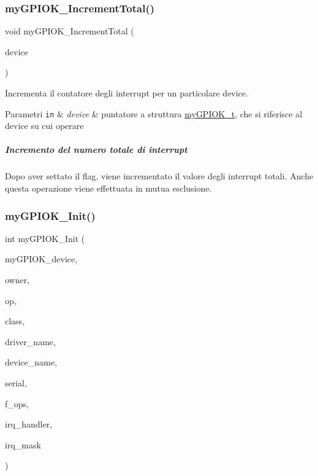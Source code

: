 \subsubsection{\texorpdfstring{my\+G\+P\+I\+O\+K\+\_\+\+Increment\+Total()}{myGPIOK\_IncrementTotal()}}
{\footnotesize\ttfamily void my\+G\+P\+I\+O\+K\+\_\+\+Increment\+Total (\begin{DoxyParamCaption}\item[{\hyperlink{structmy_g_p_i_o_k__t}{my\+G\+P\+I\+O\+K\+\_\+t} $\ast$}]{device }\end{DoxyParamCaption})}



Incrementa il contatore degli interrupt per un particolare device. 


\begin{DoxyParams}[1]{Parametri}
\mbox{\tt in}  & {\em device} & puntatore a struttura \hyperlink{structmy_g_p_i_o_k__t}{my\+G\+P\+I\+O\+K\+\_\+t}, che si riferisce al device su cui operare\\
\hline
\end{DoxyParams}
\subparagraph*{Incremento del numero totale di interrupt}

Dopo aver settato il flag, viene incrementato il valore degli interrupt totali. Anche questa operazione viene effettuata in mutua esclusione. \mbox{\label{group___linux-_driver_ga64afb2eff1f990814d792349842c522d}} 
\subsubsection{\texorpdfstring{my\+G\+P\+I\+O\+K\+\_\+\+Init()}{myGPIOK\_Init()}}
{\footnotesize\ttfamily int my\+G\+P\+I\+O\+K\+\_\+\+Init (\begin{DoxyParamCaption}\item[{\hyperlink{structmy_g_p_i_o_k__t}{my\+G\+P\+I\+O\+K\+\_\+t} $\ast$}]{my\+G\+P\+I\+O\+K\+\_\+device,  }\item[{struct module $\ast$}]{owner,  }\item[{struct platform\+\_\+device $\ast$}]{op,  }\item[{struct class $\ast$}]{class,  }\item[{const char $\ast$}]{driver\+\_\+name,  }\item[{const char $\ast$}]{device\+\_\+name,  }\item[{uint32\+\_\+t}]{serial,  }\item[{struct file\+\_\+operations $\ast$}]{f\+\_\+ops,  }\item[{irq\+\_\+handler\+\_\+t}]{irq\+\_\+handler,  }\item[{uint32\+\_\+t}]{irq\+\_\+mask }\end{DoxyParamCaption})}



